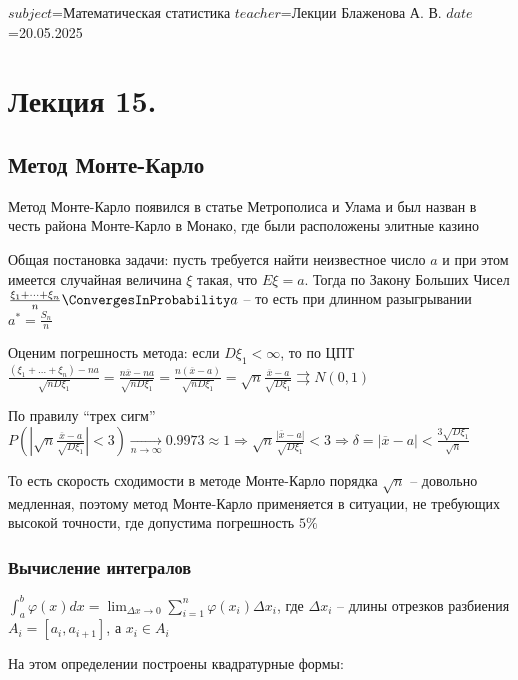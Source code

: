 $subject$=Математическая статистика
$teacher$=Лекции Блаженова А. В.
$date$=20.05.2025

\section{Лекция 15.}

\subsection{Метод Монте-Карло}

\hypertarget{monte_carlo}{}

Метод Монте-Карло появился в статье Метрополиса и Улама и был назван в честь района Монте-Карло в Монако, где были расположены элитные казино


Общая постановка задачи: пусть требуется найти неизвестное число $a$ и при этом имеется случайная величина $\xi$ такая, что $E \xi = a$. Тогда по Закону Больших Чисел $\frac{\xi_1 + \dots + \xi_n}{n} \ConvergesInProbability a$ -- то есть при длинном разыгрывании $a^* = \frac{S_n}{n}$

Оценим погрешность метода: если $D\xi_1 < \infty$, то по ЦПТ $\frac{(\xi_1 + \dots + \xi_n) - n a}{\sqrt{n D \xi_1}} = \frac{n \overline{x} - na}{\sqrt{n D\xi_1}} = \frac{n(\overline{x} - a)}{\sqrt{n D\xi_1}} = \sqrt{n} \frac{\overline{x} - a}{\sqrt{D\xi_1}} \rightrightarrows N(0, 1)$

По правилу \enquote{трех сигм} $P\left(\left|\sqrt{n} \frac{\overline{x} - a}{\sqrt{D\xi_1}}\right| < 3\right) \underset{n \to \infty}{\longrightarrow} 0.9973 \approx 1 \Longrightarrow \sqrt{n} \frac{|\overline{x} - a|}{\sqrt{D \xi_1}} < 3 \Longrightarrow \delta = |\overline{x} - a| < \frac{3\sqrt{D\xi_1}}{\sqrt{n}}$

\Nota То есть скорость сходимости в методе Монте-Карло порядка $\sqrt{n}$ -- довольно медленная, поэтому метод Монте-Карло применяется в ситуации, не требующих высокой точности, где допустима погрешность $5\%$

\subsubsection{Вычисление интегралов}

\Mem $\int_a^b \varphi(x) dx = \lim_{\Delta x \to 0} \sum_{i = 1}^n \varphi(x_i) \Delta x_i$, где $\Delta x_i$ -- длины отрезков разбиения $A_i = [a_i, a_{i + 1}]$, а $x_i \in A_i$

На этом определении построены квадратурные формы:

